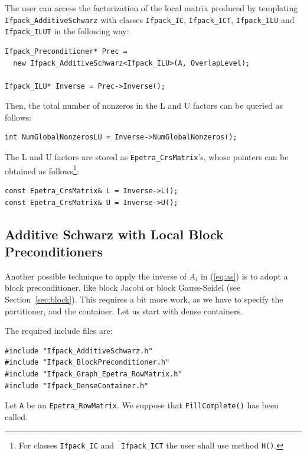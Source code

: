 The user can access the factorization of the local matrix produced by
templating \verb!Ifpack_AdditiveSchwarz! with classes \verb!Ifpack_IC!,
  \verb!Ifpack_ICT!, \verb!Ifpack_ILU! and \verb!Ifpack_ILUT! in the following
  way:
\begin{verbatim}
Ifpack_Preconditioner* Prec = 
  new Ifpack_AdditiveSchwarz<Ifpack_ILU>(A, OverlapLevel);

Ifpack_ILU* Inverse = Prec->Inverse();
\end{verbatim}
Then, the total number of nonzeros in the L and U factors can be queried as
follows:
\begin{verbatim}
int NumGlobalNonzerosLU = Inverse->NumGlobalNonzeros();
\end{verbatim}
The L and U factors are stored as \verb!Epetra_CrsMatrix!'s, whose pointers
can be obtained as follows\footnote{For classes {\tt Ifpack\_IC} and {\tt
  Ifpack\_ICT} the user shall use method {\tt H()}.}:
\begin{verbatim}
const Epetra_CrsMatrix& L = Inverse->L();
const Epetra_CrsMatrix& U = Inverse->U();
\end{verbatim}

\subsection{Additive Schwarz with Local Block Preconditioners}
\label{sec:as_b_ov}

Another possible technique to apply the inverse of $A_i$ in (\ref{eq:as})
is to adopt a block preconditioner, like block Jacobi 
or block Gauss-Seidel (see
Section~\ref{sec:block}). This requires a
bit more work, as we have to specify the partitioner, and the container. Let
us start with dense containers.

The required include files are:
\begin{verbatim}
#include "Ifpack_AdditiveSchwarz.h"
#include "Ifpack_BlockPreconditioner.h"
#include "Ifpack_Graph_Epetra_RowMatrix.h"
#include "Ifpack_DenseContainer.h"
\end{verbatim}

Let \verb!A! be an \verb!Epetra_RowMatrix!. We suppose that
\verb!FillComplete()! has been called. 


